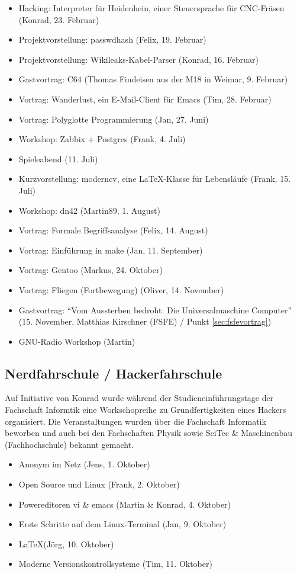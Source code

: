 \documentclass[10pt,DIV16]{scrartcl}
\begin{document}
\begin{itemize}
	\item Hacking:  Interpreter für Heidenhein, einer Steuersprache für CNC-Fräsen (Konrad, 23. Februar)
	\item Projektvorstellung:  passwdhash (Felix, 19. Februar)
	\item Projektvorstellung:  Wikileaks-Kabel-Parser (Konrad, 16. Februar)
	\item Gastvortrag:  C64 (Thomas Findeisen aus der M18 in Weimar, 9. Februar)
	\item Vortrag:  Wanderlust, ein E-Mail-Client für Emacs (Tim, 28. Februar)
	\item Vortrag: Polyglotte Programmierung  (Jan, 27. Juni)
	\item Workshop:  Zabbix + Postgres (Frank, 4. Juli)
	\item Spieleabend (11. Juli)
	\item Kurzvorstellung: moderncv, eine \LaTeX-Klasse für Lebensläufe (Frank, 15. Juli)
	\item Workshop:  dn42 (Martin89, 1. August)
	\item Vortrag:  Formale Begriffsanalyse (Felix, 14. August)
	\item Vortrag:  Einführung in make (Jan, 11. September)
	\item Vortrag:  Gentoo (Markus, 24. Oktober)
	\item Vortrag:  Fliegen (Fortbewegung) (Oliver, 14. November)
	\item Gastvortrag:  "`Vom Aussterben bedroht: Die Universalmaschine Computer"'
		(15. November, Matthias Kirschner (FSFE) / Punkt \ref{sec:fsfevortrag})
	\item GNU-Radio Workshop (Martin)
\end{itemize}

\subsection{Nerdfahrschule / Hackerfahrschule}

Auf Initiative von Konrad wurde während der Studieneinführungstage der
Fachschaft Informtik eine Workschopreihe zu Grundfertigkeiten eines Hackers
organisiert.  Die Veranstaltungen wurden über die Fachschaft Informatik
beworben und auch bei den Fachschaften Physik sowie SciTec \& Maschinenbau
(Fachhochschule) bekannt gemacht.

\begin{itemize}
	\item Anonym im Netz (Jens, 1. Oktober)
	\item Open Source und Linux (Frank, 2. Oktober)
	\item Powereditoren vi \& emacs (Martin \& Konrad, 4. Oktober)
	\item Erste Schritte auf dem Linux-Terminal (Jan, 9. Oktober)
	\item \LaTeX (Jörg, 10. Oktober)
	\item Moderne Versionskontrollsysteme (Tim, 11. Oktober)
\end{itemize}
\end{document}
